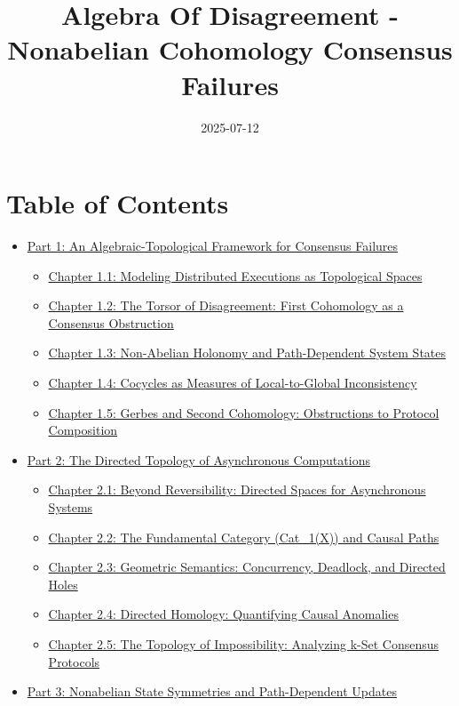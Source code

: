 \documentclass[
]{article}
\title{Algebra Of Disagreement - Nonabelian Cohomology Consensus
Failures}
\author{}
\date{2025-07-12}
\providecommand{\tightlist}{%
  \setlength{\itemsep}{0pt}\setlength{\parskip}{0pt}}
\begin{document}
\maketitle

\section{Table of Contents}\label{table-of-contents}

\begin{itemize}
\tightlist
\item
  \hyperref[part-1-An_Algebraic-Topological_Framework_for_C]{Part 1: An
  Algebraic-Topological Framework for Consensus Failures}

  \begin{itemize}
  \tightlist
  \item
    \hyperref[chapter-1-1-Modeling_Distributed_Executions_as_Topol]{Chapter
    1.1: Modeling Distributed Executions as Topological Spaces}
  \item
    \hyperref[chapter-1-2-The_Torsor_of_Disagreement__First_Cohomo]{Chapter
    1.2: The Torsor of Disagreement: First Cohomology as a Consensus
    Obstruction}
  \item
    \hyperref[chapter-1-3-Non-Abelian_Holonomy_and_Path-Dependent]{Chapter
    1.3: Non-Abelian Holonomy and Path-Dependent System States}
  \item
    \hyperref[chapter-1-4-Cocycles_as_Measures_of_Local-to-Global]{Chapter
    1.4: Cocycles as Measures of Local-to-Global Inconsistency}
  \item
    \hyperref[chapter-1-5-Gerbes_and_Second_Cohomology__Obstructio]{Chapter
    1.5: Gerbes and Second Cohomology: Obstructions to Protocol
    Composition}
  \end{itemize}
\item
  \hyperref[part-2-The_Directed_Topology_of_Asynchronous_Co]{Part 2: The
  Directed Topology of Asynchronous Computations}

  \begin{itemize}
  \tightlist
  \item
    \hyperref[chapter-2-1-Beyond_Reversibility__Directed_Spaces_fo]{Chapter
    2.1: Beyond Reversibility: Directed Spaces for Asynchronous Systems}
  \item
    \hyperref[chapter-2-2-The_Fundamental_Category__Cat_1_X___and]{Chapter
    2.2: The Fundamental Category (Cat\_1(X)) and Causal Paths}
  \item
    \hyperref[chapter-2-3-Geometric_Semantics__Concurrency__Deadlo]{Chapter
    2.3: Geometric Semantics: Concurrency, Deadlock, and Directed Holes}
  \item
    \hyperref[chapter-2-4-Directed_Homology__Quantifying_Causal_An]{Chapter
    2.4: Directed Homology: Quantifying Causal Anomalies}
  \item
    \hyperref[chapter-2-5-The_Topology_of_Impossibility__Analyzing]{Chapter
    2.5: The Topology of Impossibility: Analyzing k-Set Consensus
    Protocols}
  \end{itemize}
\item
  \hyperref[part-3-Nonabelian_State_Symmetries_and_Path-Dep]{Part 3:
  Nonabelian State Symmetries and Path-Dependent Updates}


\end{itemize}
\end{document}
